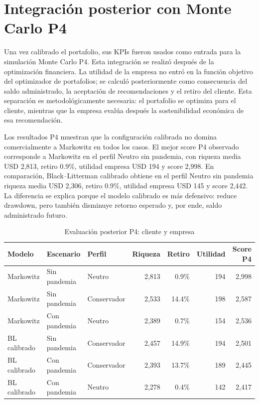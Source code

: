 \documentclass[11pt]{article}
\begin{document}
\section{Integraci\'on posterior con Monte Carlo P4}

Una vez calibrado el portafolio, sus KPIs fueron usados como entrada para la simulaci\'on Monte Carlo P4. Esta integraci\'on se realiz\'o despu\'es de la optimizaci\'on financiera. La utilidad de la empresa no entr\'o en la funci\'on objetivo del optimizador de portafolios; se calcul\'o posteriormente como consecuencia del saldo administrado, la aceptaci\'on de recomendaciones y el retiro del cliente. Esta separaci\'on es metodol\'ogicamente necesaria: el portafolio se optimiza para el cliente, mientras que la empresa eval\'ua despu\'es la sostenibilidad econ\'omica de esa recomendaci\'on.

Los resultados P4 muestran que la configuraci\'on calibrada no domina comercialmente a Markowitz en todos los casos. El mejor score P4 observado corresponde a Markowitz en el perfil Neutro sin pandemia, con riqueza media USD 2,813, retiro 0.9\%, utilidad empresa USD 194 y score 2,998. En comparaci\'on, Black--Litterman calibrado obtiene en el perfil Neutro sin pandemia riqueza media USD 2,306, retiro 0.9\%, utilidad empresa USD 145 y score 2,442. La diferencia se explica porque el modelo calibrado es m\'as defensivo: reduce drawdown, pero tambi\'en disminuye retorno esperado y, por ende, saldo administrado futuro.

\begin{table}[H]
\centering
\caption{Evaluaci\'on posterior P4: cliente y empresa}
\label{tab:p4}
\begin{tabular}{l l l r r r r}
\toprule
Modelo & Escenario & Perfil & Riqueza & Retiro & Utilidad & Score P4 \\
\midrule
Markowitz & Sin pandemia & Neutro & 2,813 & 0.9\% & 194 & 2,998 \\
Markowitz & Sin pandemia & Conservador & 2,533 & 14.4\% & 198 & 2,587 \\
Markowitz & Con pandemia & Neutro & 2,389 & 0.7\% & 154 & 2,536 \\
BL calibrado & Sin pandemia & Conservador & 2,457 & 14.9\% & 194 & 2,501 \\
BL calibrado & Con pandemia & Conservador & 2,393 & 13.7\% & 189 & 2,445 \\
BL calibrado & Con pandemia & Neutro & 2,278 & 0.4\% & 142 & 2,417 \\
\bottomrule
\end{tabular}
\end{table}
\end{document}
